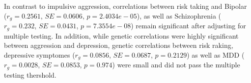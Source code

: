 In contrast to impulsive aggression, correlations between risk taking and Bipolar ($r_g=0.2561$, $SE=0.0606$, $p=2.4034e-05$), as well as Schizophrenia ($r_g=0.232$, $SE=0.0431$, $p=7.3554e-08$) remain significant after adjusting for multiple testing.
In addition, while genetic correlations were highly significant between aggression and depression, genetic correlations between risk raking, depressive symptomes ($r_g=0.0856$, $SE=0.0687$, $p=0.2129$) as well as MDD ($r_g=0.0028$, $SE=0.0853$, $p=0.974$) were small and did not pass the multiple testing thershold.
